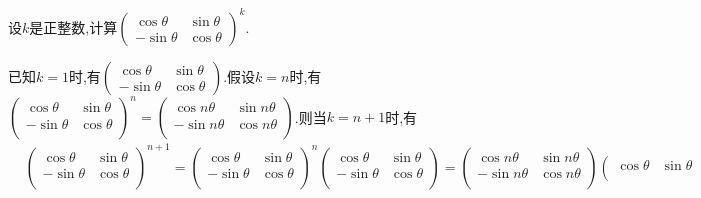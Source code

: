 \documentclass[lang=cn,newtx,10pt,scheme=chinese]{elegantbook}
\begin{document}
\begin{exercise}
设\(k\)是正整数,计算\(\begin{pmatrix}
\cos\theta & \sin\theta\\
-\sin\theta & \cos\theta
\end{pmatrix}^k\).
\end{exercise}
\begin{solution}
    已知$k=1$时,有\(\begin{pmatrix}
        \cos\theta & \sin\theta\\
        -\sin\theta & \cos\theta
        \end{pmatrix}\).假设$k=n$时,有$\left( \begin{matrix}
            \cos \theta&		\sin \theta\\
            -\sin \theta&		\cos \theta\\
        \end{matrix} \right) ^n=\left( \begin{matrix}
            \cos n\theta&		\sin n\theta\\
            -\sin n\theta&		\cos n\theta\\
        \end{matrix} \right) $.则当$k=n+1$时,有
\begin{align*}
    &\left( \begin{matrix}
        \cos \theta&		\sin \theta\\
        -\sin \theta&		\cos \theta\\
    \end{matrix} \right) ^{n+1}=\left( \begin{matrix}
        \cos \theta&		\sin \theta\\
        -\sin \theta&		\cos \theta\\
    \end{matrix} \right) ^n\left( \begin{matrix}
        \cos \theta&		\sin \theta\\
        -\sin \theta&		\cos \theta\\
    \end{matrix} \right) =\left( \begin{matrix}
        \cos n\theta&		\sin n\theta\\
        -\sin n\theta&		\cos n\theta\\
    \end{matrix} \right) \left( \begin{matrix}
        \cos \theta&		\sin \theta\\

\end{matrix}
\end{align*}
\end{solution}
\end{document}

